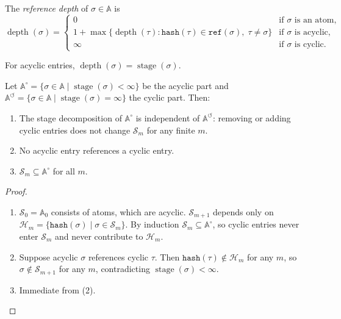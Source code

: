\begin{definition}
\label{def:depth}
The \emph{reference depth} of $\sigma \in \mathbb{A}$ is
\[
\operatorname{depth}(\sigma) = \begin{cases} 0 & \text{if } \sigma \text{ is an atom,} \\ 1 + \max\{\operatorname{depth}(\tau) : \texttt{hash}(\tau) \in \texttt{ref}(\sigma),\; \tau \neq \sigma\} & \text{if } \sigma \text{ is acyclic,} \\ \infty & \text{if } \sigma \text{ is cyclic.} \end{cases}
\]
\end{definition}

For acyclic entries, $\operatorname{depth}(\sigma) = \operatorname{stage}(\sigma)$.

\begin{theorem}
\label{thm:cycle-stage}
Let $\mathbb{A}^{\circ} = \{\sigma \in \mathbb{A} \mid \operatorname{stage}(\sigma) < \infty\}$ be the acyclic part and $\mathbb{A}^{\circlearrowleft} = \{\sigma \in \mathbb{A} \mid \operatorname{stage}(\sigma) = \infty\}$ the cyclic part. Then:
\begin{enumerate}
\item The stage decomposition of $\mathbb{A}^{\circ}$ is independent of $\mathbb{A}^{\circlearrowleft}$: removing or adding cyclic entries does not change $\mathcal{S}_m$ for any finite $m$.
\item No acyclic entry references a cyclic entry.
\item $\mathcal{S}_m \subseteq \mathbb{A}^{\circ}$ for all $m$.
\end{enumerate}
\end{theorem}

\begin{proof} \mbox{}
\begin{enumerate}
\item $\mathcal{S}_0 = \mathbb{A}_0$ consists of atoms, which are acyclic. $\mathcal{S}_{m+1}$ depends only on $\mathcal{H}_m = \{\texttt{hash}(\sigma) \mid \sigma \in \mathcal{S}_m\}$. By induction $\mathcal{S}_m \subseteq \mathbb{A}^{\circ}$, so cyclic entries never enter $\mathcal{S}_m$ and never contribute to $\mathcal{H}_m$.
\item Suppose acyclic $\sigma$ references cyclic $\tau$. Then $\texttt{hash}(\tau) \notin \mathcal{H}_m$ for any $m$, so $\sigma \notin \mathcal{S}_{m+1}$ for any $m$, contradicting $\operatorname{stage}(\sigma) < \infty$.
\item Immediate from (2).
\end{enumerate}
\end{proof}

